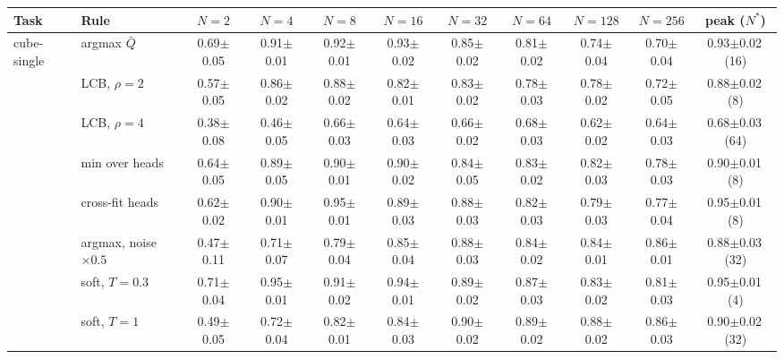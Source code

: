 \begin{tabular}{ll cccccccc c}
\toprule
Task & Rule & $N{=}2$ & $N{=}4$ & $N{=}8$ & $N{=}16$ & $N{=}32$ & $N{=}64$ & $N{=}128$ & $N{=}256$ & peak ($N^\ast$) \\
\midrule
cube-single & argmax $\bar Q$ & 0.69{\scriptsize$\pm$0.05} & 0.91{\scriptsize$\pm$0.01} & 0.92{\scriptsize$\pm$0.01} & 0.93{\scriptsize$\pm$0.02} & 0.85{\scriptsize$\pm$0.02} & 0.81{\scriptsize$\pm$0.02} & 0.74{\scriptsize$\pm$0.04} & 0.70{\scriptsize$\pm$0.04} & 0.93{\scriptsize$\pm$0.02}\,(16) \\
 & LCB, $\rho{=}2$ & 0.57{\scriptsize$\pm$0.05} & 0.86{\scriptsize$\pm$0.02} & 0.88{\scriptsize$\pm$0.02} & 0.82{\scriptsize$\pm$0.01} & 0.83{\scriptsize$\pm$0.02} & 0.78{\scriptsize$\pm$0.03} & 0.78{\scriptsize$\pm$0.02} & 0.72{\scriptsize$\pm$0.05} & 0.88{\scriptsize$\pm$0.02}\,(8) \\
 & LCB, $\rho{=}4$ & 0.38{\scriptsize$\pm$0.08} & 0.46{\scriptsize$\pm$0.05} & 0.66{\scriptsize$\pm$0.03} & 0.64{\scriptsize$\pm$0.03} & 0.66{\scriptsize$\pm$0.02} & 0.68{\scriptsize$\pm$0.03} & 0.62{\scriptsize$\pm$0.02} & 0.64{\scriptsize$\pm$0.03} & 0.68{\scriptsize$\pm$0.03}\,(64) \\
 & min over heads & 0.64{\scriptsize$\pm$0.05} & 0.89{\scriptsize$\pm$0.05} & 0.90{\scriptsize$\pm$0.01} & 0.90{\scriptsize$\pm$0.02} & 0.84{\scriptsize$\pm$0.05} & 0.83{\scriptsize$\pm$0.02} & 0.82{\scriptsize$\pm$0.03} & 0.78{\scriptsize$\pm$0.03} & 0.90{\scriptsize$\pm$0.01}\,(8) \\
 & cross-fit heads & 0.62{\scriptsize$\pm$0.02} & 0.90{\scriptsize$\pm$0.01} & 0.95{\scriptsize$\pm$0.01} & 0.89{\scriptsize$\pm$0.03} & 0.88{\scriptsize$\pm$0.03} & 0.82{\scriptsize$\pm$0.03} & 0.79{\scriptsize$\pm$0.03} & 0.77{\scriptsize$\pm$0.04} & 0.95{\scriptsize$\pm$0.01}\,(8) \\
 & argmax, noise $\times 0.5$ & 0.47{\scriptsize$\pm$0.11} & 0.71{\scriptsize$\pm$0.07} & 0.79{\scriptsize$\pm$0.04} & 0.85{\scriptsize$\pm$0.04} & 0.88{\scriptsize$\pm$0.03} & 0.84{\scriptsize$\pm$0.02} & 0.84{\scriptsize$\pm$0.01} & 0.86{\scriptsize$\pm$0.01} & 0.88{\scriptsize$\pm$0.03}\,(32) \\
 & soft, $T{=}0.3$ & 0.71{\scriptsize$\pm$0.04} & 0.95{\scriptsize$\pm$0.01} & 0.91{\scriptsize$\pm$0.02} & 0.94{\scriptsize$\pm$0.01} & 0.89{\scriptsize$\pm$0.02} & 0.87{\scriptsize$\pm$0.03} & 0.83{\scriptsize$\pm$0.02} & 0.81{\scriptsize$\pm$0.03} & 0.95{\scriptsize$\pm$0.01}\,(4) \\
 & soft, $T{=}1$ & 0.49{\scriptsize$\pm$0.05} & 0.72{\scriptsize$\pm$0.04} & 0.82{\scriptsize$\pm$0.01} & 0.84{\scriptsize$\pm$0.03} & 0.90{\scriptsize$\pm$0.02} & 0.89{\scriptsize$\pm$0.02} & 0.88{\scriptsize$\pm$0.02} & 0.86{\scriptsize$\pm$0.03} & 0.90{\scriptsize$\pm$0.02}\,(32) \\

\end{tabular}
